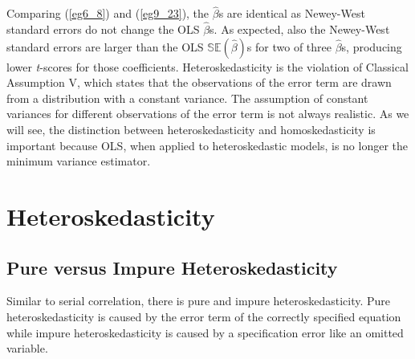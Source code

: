 \documentclass[11pt]{article}
\begin{document}
Comparing (\ref{eg6_8}) and (\ref{eg9_23}), the $\hat{\beta}$s are identical as Newey-West standard errors do not change the OLS $\hat{\beta}$s. As expected, also the Newey-West standard errors are larger than the OLS $\mathbb{SE}(\hat{\beta})$s for two of three $\hat{\beta}$s, producing lower \textit{t}-scores for those coefficients. 
Heteroskedasticity is the violation of Classical Assumption V, which states that the observations of the error term are drawn from a distribution with a constant variance. The assumption of constant variances for different observations of the error term is not always realistic. As we will see, the distinction between heteroskedasticity and homoskedasticity is important because OLS, when applied to heteroskedastic models, is no longer the minimum variance estimator.
\clearpage
\section{Heteroskedasticity}
\subsection{Pure versus Impure Heteroskedasticity}
Similar to serial correlation, there is pure and impure heteroskedasticity. Pure heteroskedasticity is caused by the error term of the correctly specified equation while impure heteroskedasticity is caused by a specification error like an omitted variable.
\end{document}

